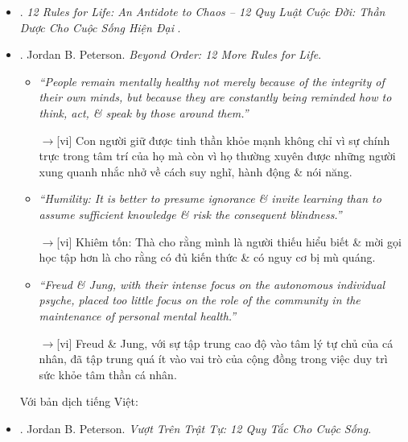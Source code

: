 \documentclass[12pt,oneside]{book}
\begin{document}
\begin{itemize}
\begin{itemize}
		{\sf[en]$\to$[vi]} Bởi vì chúng thực sự là những quy tắc. \& nguyên tắc quan trọng nhất là bạn phải chịu trách nhiệm về cuộc sống của chính mình. Chấm hết.
	\end{itemize}
	Với bản dịch tiếng Việt:
	\item \cite{Peterson_rule_VN}. {\it 12 Rules for Life: An Antidote to Chaos -- 12 Quy Luật Cuộc Đời: Thần Dược Cho Cuộc Sống Hiện Đại} .
	\item \cite{Peterson_beyond_order}. {\sc Jordan B. Peterson}. {\it Beyond Order: 12 More Rules for Life}.
	\begin{itemize}
		\item {\it``People remain mentally healthy not merely because of the integrity of their own minds, but because they are constantly being reminded how to think, act, \& speak by those around them.''}
		
		{\sf[en]$\to$[vi]} Con người giữ được tinh thần khỏe mạnh không chỉ vì sự chính trực trong tâm trí của họ mà còn vì họ thường xuyên được những người xung quanh nhắc nhở về cách suy nghĩ, hành động \& nói năng.
		
		\item {\it``Humility: It is better to presume ignorance \& invite learning than to assume sufficient knowledge \& risk the consequent blindness.''}
		
		{\sf[en]$\to$[vi]} Khiêm tốn: Thà cho rằng mình là người thiếu hiểu biết \& mời gọi học tập hơn là cho rằng có đủ kiến thức \& có nguy cơ bị mù quáng.
		
		\item {\it``{\sc Freud} \& {\sc Jung}, with their intense focus on the autonomous individual psyche, placed too little focus on the role of the community in the maintenance of personal mental health.''}
		
		{\sf[en]$\to$[vi]} {\sc Freud} \& {\sc Jung}, với sự tập trung cao độ vào tâm lý tự chủ của cá nhân, đã tập trung quá ít vào vai trò của cộng đồng trong việc duy trì sức khỏe tâm thần cá nhân.
	\end{itemize}
	Với bản dịch tiếng Việt:
	\item \cite{Peterson_beyond_order_VN}. {\sc Jordan B. Peterson}. {\it Vượt Trên Trật Tự: 12 Quy Tắc Cho Cuộc Sống}.
\end{itemize}
\end{document}
